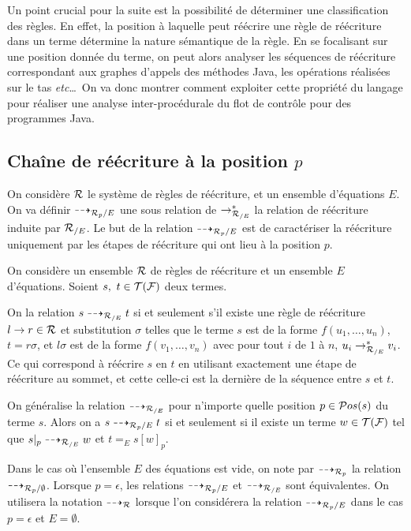Un point crucial pour la suite est la possibilité de déterminer une
classification des règles. En effet, la position à laquelle peut
réécrire une règle de réécriture dans un terme détermine la nature
sémantique de la règle. En se focalisant sur une position donnée du
terme, on peut alors analyser les séquences de réécriture
correspondant aux graphes d'appels des méthodes Java, les opérations
réalisées sur le tas \textit{etc}\dots\ On va donc montrer comment
exploiter cette propriété du langage pour réaliser une analyse
inter-procédurale du flot de contrôle pour des programmes Java.

\subsection{Chaîne de réécriture à la position $p$}

On considère $\mathcal R$ le système de règles de réécriture, et un ensemble d'équations $E$.
On va définir $\dashrightarrow_{\mathcal R_p/E}$ une sous relation de $\rightarrow_{\mathcal R_{/E}}^*$ la
relation de réécriture induite par ${\mathcal R_{/E}}$.  Le but de la relation
$\dashrightarrow_{\mathcal R_p/E}$ est de caractériser la réécriture uniquement par les
étapes de réécriture qui ont lieu à la position $p$.

\begin{definition}
  \label{def:arw}
  On considère un ensemble $\mathcal R$ de règles de réécriture et un ensemble $E$ d'équations.
  Soient $s,\ t \in \mathcal{T(F)}$ deux termes. %
  \begin{description}
  \item On la relation $s \dashrightarrow_{\mathcal R_{/E}} t$ si et seulement s'il existe une règle de
    réécriture $l \rightarrow r \in \mathcal R$ et substitution $\sigma$ telles que le terme $s$
    est de la forme $f(u_1, \dots, u_n)$, $t = r\sigma$, et $l\sigma$ est de la forme 
    $f(v_1,\dots,v_n)$ avec pour tout $i$ de $1$ à $n$, $u_i \rightarrow^*_{\mathcal R_{/E}} v_i$.
    Ce qui correspond à réécrire $s$ en $t$ en utilisant exactement une étape de réécriture au sommet,
    et cette celle-ci est la dernière de la séquence entre $s$ et $t$.
  \item
    On généralise la relation $\dashrightarrow_{\mathcal R_{/E}}$ pour n'importe quelle position $p\in \mathcal{ P}os(s)$ du terme $s$.
    Alors on a \textbf{$s \dashrightarrow_{\mathcal R_p/E} t$} si et seulement si
    il existe un terme $w \in \mathcal{T(F)}$ tel que $s|_p \dashrightarrow_{\mathcal R_{/E}} w$ et $t=_E s[w]_p$.
  \end{description}
\end{definition}

Dans le cas où l'ensemble $E$ des équations est vide, on note par $\dashrightarrow_{\mathcal R_p}$ la relation $\dashrightarrow_{\mathcal R_p/\emptyset}$.
Lorsque $p=\epsilon$, les relations $\dashrightarrow_{\mathcal R_p/E}$ et $\dashrightarrow_{{\mathcal R_{/E}}}$ sont équivalentes. On utilisera la notation $\dashrightarrow_\mathcal R$ 
lorsque l'on considérera la relation $\dashrightarrow_{\mathcal R_p/E}$ dans le cas $p = \epsilon$ et $E = \emptyset$. 


